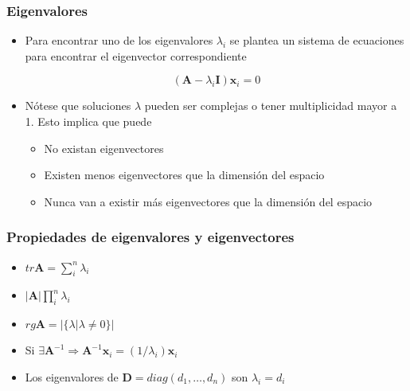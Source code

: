 \documentclass{beamer}
\begin{document}
\begin{frame}
\frametitle{Eigenvalores}
\begin{itemize}
\item Para encontrar uno de los eigenvalores $\lambda_{i}$ se plantea un sistema de ecuaciones para encontrar el eigenvector correspondiente 

\begin{equation*}
( \boldsymbol{A}- \lambda_{i} \boldsymbol{I})\boldsymbol{x}_{i}=0
\end{equation*}  


\item Nótese que soluciones $\lambda$ pueden ser complejas o tener multiplicidad mayor a 1. Esto implica que puede 
\begin{itemize}
\item No existan eigenvectores
\item Existen menos eigenvectores que la dimensión del espacio 
\item Nunca van a existir más eigenvectores que la dimensión del espacio 
\end{itemize}


\end{itemize}

\end{frame}
\begin{frame}
\frametitle{Propiedades de eigenvalores y eigenvectores}
\begin{itemize}
\item $tr \boldsymbol{A} = \sum_{i}^{n}{\lambda_{i}}$
\item $ \vert \boldsymbol{A} \vert \prod_{i}^{n} \lambda_{i}$
\item $rg \boldsymbol{A} = \vert \lbrace \lambda \vert \lambda \neq 0 \rbrace \vert$
\item Si $\exists \boldsymbol{A}^{-1} \Longrightarrow \boldsymbol{A}^{-1}\boldsymbol{x}_{i}= (1/\lambda_{i})\boldsymbol{x}_i$ 
\item Los eigenvalores de $\boldsymbol{D}= diag(d_1,\ldots,d_n)$ son $\lambda_i=d_i$
\end{itemize}



\end{frame}
\end{document}
